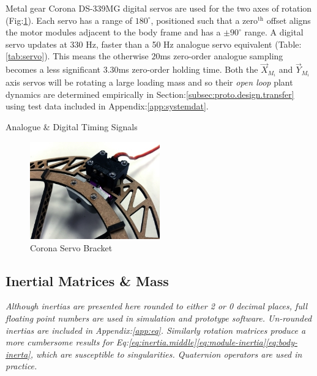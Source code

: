 \par
Metal gear Corona DS-339MG digital servos are used for the two axes of rotation (Fig:\ref{fig:motor-servo}). Each servo has a range of $180^{\circ}$, positioned such that a $\text{zero}^{\text{th}}$ offset aligns the motor modules  adjacent to the body frame and has a $\pm 90^{\circ}$ range. A digital servo updates at 330 Hz, faster than a 50 Hz analogue servo equivalent (Table:\ref{tab:servo}). This means the otherwise $20$ms zero-order analogue sampling becomes a less significant $3.30$ms zero-order holding time. Both the $\vec{X}_{M_i}$ and $\vec{Y}_{M_i}$ axis servos will be rotating a large loading mass and so their \emph{open loop} plant dynamics are determined empirically in Section:\ref{subsec:proto.design.transfer} using test data included in Appendix:\ref{app:systemdat}.
\begin{table}[h]
\centering
{}
\caption{Analogue \& Digital Timing Signals}
\label{tab:servo}
\end{table}
\begin{figure}[htbp]
\centering
\includegraphics[width=0.5\textwidth]{figs/motor-servo}
\caption{Corona Servo Bracket}
\label{fig:motor-servo}
\end{figure}
\subsection{Inertial Matrices \& Mass}
\label{subsec:proto.design.inertia}
\emph{\color{Gray} Although inertias are presented here rounded to either 2 or 0 decimal places, full floating point numbers are used in simulation and prototype software. Un-rounded inertias are included in Appendix:\ref{app:eq}. Similarly rotation matrices produce a more cumbersome results for Eq:\ref{eq:inertia.middle}\ref{eq:module-inertia}\ref{eq:body-inerta}, which are susceptible to singularities. Quaternion operators are used in practice.}

